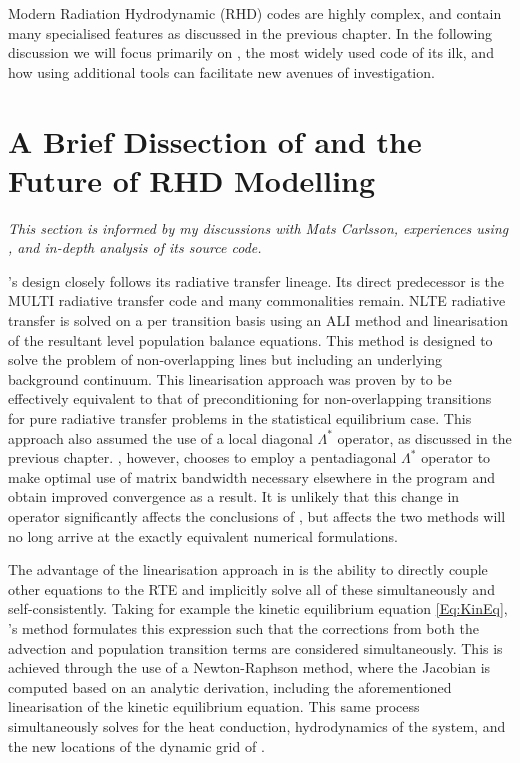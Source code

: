 Modern Radiation Hydrodynamic (RHD) codes are highly complex, and contain many specialised features as discussed in the previous chapter.
In the following discussion we will focus primarily on \Radyn{}, the most widely used code of its ilk, and how using additional tools can facilitate new avenues of investigation.



\section{A Brief Dissection of \Radyn{} and the Future of RHD Modelling}

\emph{This section is informed by my discussions with Mats Carlsson, experiences using \Radyn{}, and in-depth analysis of its source code.}

\Radyn{}'s design closely follows its radiative transfer lineage. Its direct predecessor is the MULTI radiative transfer code and many commonalities remain.
NLTE radiative transfer is solved on a per transition basis using an ALI method and linearisation of the resultant level population balance equations.
This method is designed to solve the problem of non-overlapping lines but including an underlying background continuum.
This linearisation approach was proven by \citet{SocasNavarro1997} to be effectively equivalent to that of preconditioning for non-overlapping transitions \citep{Rybicki1991} for pure radiative transfer problems in the statistical equilibrium case.
This approach also assumed the use of a local diagonal $\Lambda^*$ operator, as discussed in the previous chapter.
\Radyn{}, however, chooses to employ a pentadiagonal $\Lambda^*$ operator to make optimal use of matrix bandwidth necessary elsewhere in the program and obtain improved convergence as a result.
It is unlikely that this change in operator significantly affects the conclusions of \citet{SocasNavarro1997}, but affects the two methods will no long arrive at the exactly equivalent numerical formulations.

The advantage of the linearisation approach in \Radyn{} is the ability to directly couple other equations to the RTE and implicitly solve all of these simultaneously and self-consistently.
Taking for example the kinetic equilibrium equation \eqref{Eq:KinEq}, \Radyn{}'s method formulates this expression such that the corrections from both the advection and population transition terms are considered simultaneously.
This is achieved through the use of a Newton-Raphson method, where the Jacobian is computed based on an analytic derivation, including the aforementioned linearisation of the kinetic equilibrium equation.
This same process simultaneously solves for the heat conduction, hydrodynamics of the system, and the new locations of the dynamic grid of \citet{Dorfi1987}.

